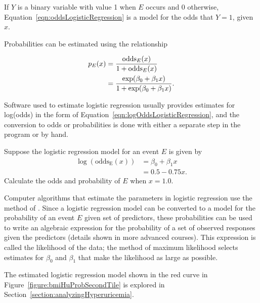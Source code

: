 If $Y$ is a binary variable with value 1 when $E$ occurs and 0 otherwise,
Equation~\ref{eqn:oddsLogisticRegression} is a model for the odds that $Y = 1$, given $x$.

Probabilities can be estimated using the relationship

\begin{align}
  p_{E}(x) &= \frac{\text{odds}_{E}(x)}{1 + \text{odds}_{E}(x)} \notag \\
        &= \frac{\exp(\beta_0 + \beta_1 x)}
        {1 + \exp(\beta_0 + \beta_1 x)}.
        \label{eqn:probLogisticRegression}
 \end{align}

Software used to estimate logistic regression usually provides estimates for log(odds) in the form of Equation~\ref{eqn:logOddsLogisticRegression}, and the conversion to odds or probabilities is done with either a separate step in the program or by hand.

\begin{exercisewrap}
\begin{nexercise}\label{guidedPracticeSimpleModel}
Suppose the logistic regression model for an event $E$ is given by
\begin{align*}
\log(\text{odds}_\text{E}(x)) &= \beta_0 + \beta_1 x \\
             &= 0.5 - 0.75x.
\end{align*}
Calculate the odds and probability of $E$ when $x = 1.0$.
\footnotemark{}
\end{nexercise}
\end{exercisewrap}

Computer algorithms that estimate the parameters in logistic regression use the method of .  Since a logistic regression model can be converted to a model for the probability of an event $E$ given set of predictors, these probabilities can be used to write an algebraic expression for the probability of a set of observed responses given the predictors (details shown in more advanced courses).  This expression is called the likelihood of the data; the method of maximum likelihood selects estimates for $\beta_0$ and $\beta_1$ that make the likelihood as large as possible.

The estimated logistic regression model shown in the red curve in Figure~\ref{figure:bmiHuProbSecondTile} is explored in Section~\ref{section:analyzingHyperuricemia}.

